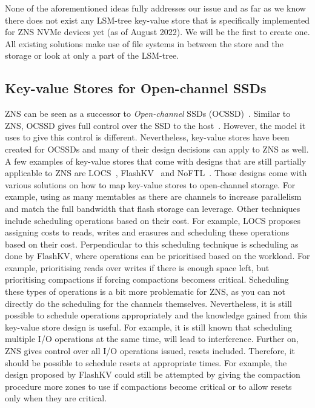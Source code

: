 None of the aforementioned ideas fully addresses our issue and as far as we know there does not exist any LSM-tree key-value store that is specifically implemented for ZNS NVMe devices yet (as of August 2022). We will be the first to create one. All existing solutions make use of file systems in between the store and the storage or look at only a part of the LSM-tree. 

\subsection{Key-value Stores for Open-channel SSDs}
\label{sec:ocssd}
ZNS can be seen as a successor to \textit{Open-channel} SSDs (OCSSD)~\cite{bjorling2021zns}. Similar to ZNS, OCSSD gives full control over the SSD to the host~\cite{bjorling2017lightnvm}. However, the model it uses to give this control is different. Nevertheless, key-value stores have been created for OCSSDs and many of their design decisions can apply to ZNS as well. A few examples of key-value stores that come with designs that are still partially applicable to ZNS are LOCS~\cite{wang2014efficient}, FlashKV~\cite{zhang2017flashkv} and NoFTL~\cite{vinccon2018noftl}. Those designs come with various solutions on how to map key-value stores to open-channel storage. For example, using as many memtables as there are channels to increase parallelism and match the full bandwidth that flash storage can leverage. Other techniques include scheduling operations based on their cost. For example, LOCS proposes assigning costs to reads, writes and erasures and scheduling these operations based on their cost. Perpendicular to this scheduling technique is scheduling as done by FlashKV, where operations can be prioritised based on the workload. For example, prioritising reads over writes if there is enough space left, but prioritising compactions if forcing compactions becomess critical. Scheduling these types of operations is a bit more problematic for ZNS, as you can not directly do the scheduling for the channels themselves. Nevertheless, it is still possible to schedule operations appropriately and the knowledge gained from this key-value store design is useful. For example, it is still known that scheduling multiple I/O operations at the same time, will lead to interference. Further on, ZNS gives control over all I/O operations issued, resets included. Therefore, it should be possible to schedule resets at appropriate times. For example, the design proposed by FlashKV could still be attempted by giving the compaction procedure more zones to use if compactions become critical or to allow resets only when they are critical. 


